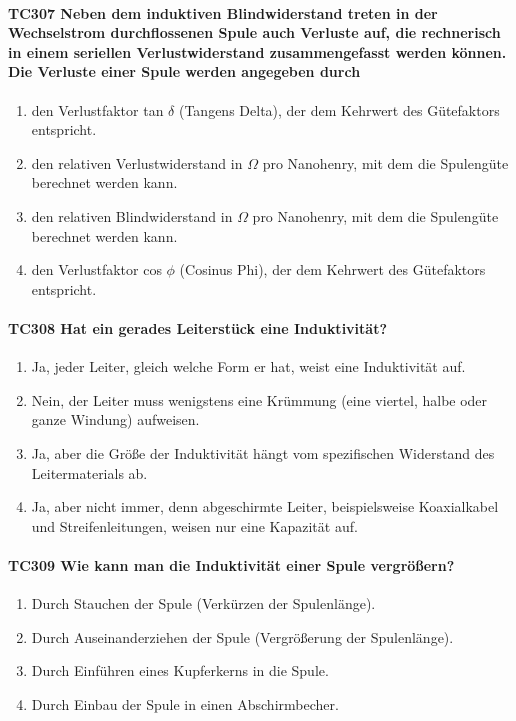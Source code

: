 \documentclass[8pt]{article}
\begin{document}
\begin{enumerate}
\begin{enumerate}[nolistsep,label=\Alph*]
{\paragraph*{TC307 Neben dem induktiven Blindwiderstand treten in der Wechselstrom durchflossenen Spule auch Verluste auf, die rechnerisch in einem seriellen Verlustwiderstand zusammengefasst werden können. Die Verluste einer Spule werden angegeben durch}
\begin{enumerate}[nolistsep,label=\Alph*]
\item den Verlustfaktor tan $\delta$ (Tangens Delta), der dem Kehrwert des Gütefaktors entspricht.
\item den relativen Verlustwiderstand in $\Omega$ pro Nanohenry, mit dem die Spulengüte berechnet werden kann.
\item den relativen Blindwiderstand in $\Omega$ pro Nanohenry, mit dem die Spulengüte berechnet werden kann.
\item den Verlustfaktor cos $\phi$ (Cosinus Phi), der dem Kehrwert des Gütefaktors entspricht.
\end{enumerate}

\paragraph*{TC308 Hat ein gerades Leiterstück eine Induktivität?}
\begin{enumerate}[nolistsep,label=\Alph*]
\item Ja, jeder Leiter, gleich welche Form er hat, weist eine Induktivität auf.
\item Nein, der Leiter muss wenigstens eine Krümmung (eine viertel, halbe oder ganze Windung) aufweisen.
\item Ja, aber die Größe der Induktivität hängt vom spezifischen Widerstand des Leitermaterials ab.
\item Ja, aber nicht immer, denn abgeschirmte Leiter, beispielsweise Koaxialkabel und Streifenleitungen, weisen nur eine Kapazität auf.
\end{enumerate}

\paragraph*{TC309 Wie kann man die Induktivität einer Spule vergrößern?}
\begin{enumerate}[nolistsep,label=\Alph*]
\item Durch Stauchen der Spule (Verkürzen der Spulenlänge).
\item Durch Auseinanderziehen der Spule (Vergrößerung der Spulenlänge).
\item Durch Einführen eines Kupferkerns in die Spule.
\item Durch Einbau der Spule in einen Abschirmbecher.
\end{enumerate}

}
\end{enumerate}
\end{enumerate}
\end{document}

